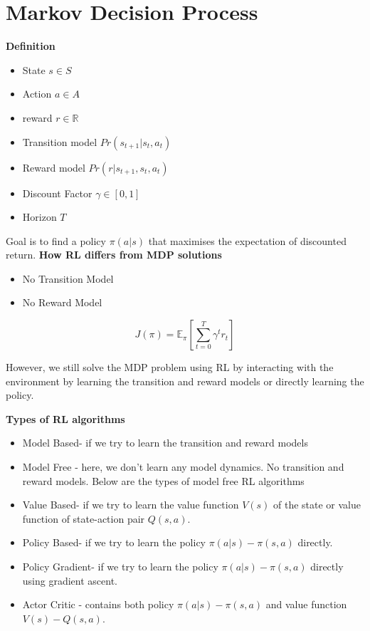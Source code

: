 \documentclass{article}
\begin{document}
\section{Markov Decision Process}
\textbf{Definition}
\begin{itemize}
    \item State $s \in S$
    \item Action $a \in A$
    \item reward $r \in \mathbb{R} $
    \item Transition model $Pr(s_{t+1} | s_t, a_t)$
    \item Reward model $Pr(r |  s_{t+1}, s_t, a_t)$
    \item Discount Factor $\gamma \in [0,1]$
    \item Horizon $T$
\end{itemize}
Goal is to find a policy $\pi(a|s)$ that maximises the expectation of discounted return.
\newline
\textbf{How RL differs from MDP solutions}
\begin{itemize}
    \item No Transition Model
    \item No Reward Model
\end{itemize}
$$ J(\pi) = \mathbb{E}_\pi \left[ \sum\limits_{t=0}^T \gamma^t r_t \right]$$

However, we still solve the MDP problem using RL by interacting with the environment by learning the transition and reward models or directly learning the policy.

\textbf{Types of RL algorithms}
\begin{itemize}
    \item Model Based- if we try to learn the transition and reward models
    \item Model Free - here, we don't learn any model dynamics. No transition and reward models. Below are the types of model free RL algorithms
    \item Value Based- if we try to learn the value function $V(s)$ of the state or value function of state-action pair $Q(s,a)$.
    \item Policy Based- if we try to learn the policy $\pi(a|s) -  \pi(s,a)$ directly.
    \item Policy Gradient- if we try to learn the policy $\pi(a|s) - \pi(s,a)$ directly using gradient ascent.
    \item Actor Critic - contains both policy $\pi(a|s) - \pi(s,a)$ and value function $V(s) -  Q(s,a)$.
\end{itemize}
\end{document}
